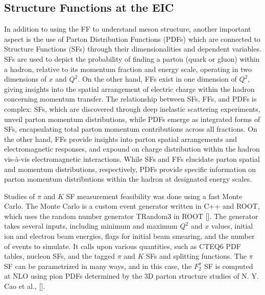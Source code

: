 \documentclass[
]{report}
\begin{document}
\hypertarget{structure-functions-at-the-eic}{%
\subsection{Structure Functions at the
EIC}\label{structure-functions-at-the-eic}}

In addition to using the FF to understand meson structure, another
important aspect is the use of Parton Distribution Functions (PDFs)
which are connected to Structure Functions (SFs) through their
dimensionalities and dependent variables. SFs are used to depict the
probability of finding a parton (quark or gluon) within a hadron,
relative to its momentum fraction and energy scale, operating in two
dimensions of \(x\) and \(Q^2\). On the other hand, FFs exist in one
dimension of \(Q^2\), giving insights into the spatial arrangement of
electric charge within the hadron concerning momentum transfer. The
relationship between SFs, FFs, and PDFs is complex: SFs, which are
discovered through deep inelastic scattering experiments, unveil parton
momentum distributions, while PDFs emerge as integrated forms of SFs,
encapsulating total parton momentum contributions across all fractions.
On the other hand, FFs provide insights into parton spatial arrangements
and electromagnetic responses, and expound on charge distribution within
the hadron vis-à-vis electromagnetic interactions. While SFs and FFs
elucidate parton spatial and momentum distributions, respectively, PDFs
provide specific information on parton momentum distributions within the
hadron at designated energy scales.

Studies of \(\pi\) and \(K\) SF measurement feasibility was done using a
fast Monte Carlo. The Monte Carlo is a custom event generator written in
C++ and ROOT, which uses the random number generator TRandom3 in ROOT
{[}\cite{trotta_eic_2020}{]}. The generator takes several inputs,
including minimum and maximum \(Q^2\) and \(x\) values, initial ion and
electron beam energies, flags for initial beam smearing, and the number
of events to simulate. It calls upon various quantities, such as CTEQ6
PDF tables, nucleon SFs, and the tagged \(\pi\) and \(K\) SFs and
splitting functions. The \(\pi\) SF can be parametrized in many ways,
and in this case, the \(F_2^\pi\) SF is computed at NLO using pion PDFs
determined by the 3D parton structure studies of N. Y. Cao et al.,
{[}\cite{cao_towards_2021}{]}.


\end{document}
